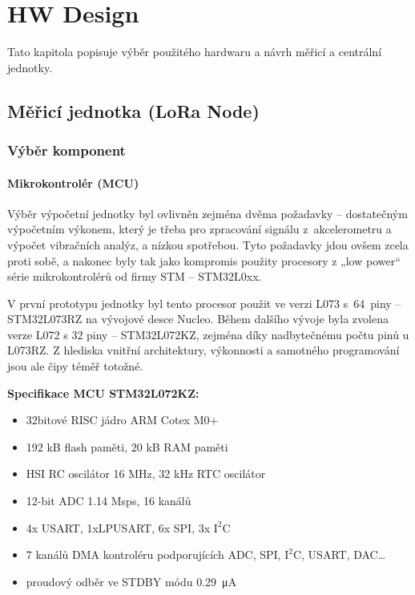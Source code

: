 \chapter{HW Design}
    Tato kapitola popisuje výběr použitého hardwaru a návrh měřicí a centrální jednotky.
\section{Měřicí jednotka (LoRa Node)}
\subsection{Výběr komponent}
\subsubsection{Mikrokontrolér (MCU)}
    Výběr výpočetní jednotky byl ovlivněn zejména dvěma požadavky – dostatečným výpočetním výkonem, který je třeba pro zpracování signálu z~akcelerometru a výpočet vibračních analýz, a nízkou spotřebou. Tyto požadavky jdou ovšem zcela proti sobě, a nakonec byly tak jako kompromis použity procesory z „low power“ série mikrokontrolérů od firmy STM – STM32L0xx.
    
    V první prototypu jednotky byl tento procesor použit ve verzi L073 s~64~piny – STM32L073RZ na vývojové desce Nucleo. Během dalšího vývoje byla zvolena verze L072 s 32 piny – STM32L072KZ, zejména díky nadbytečnému počtu pinů u L073RZ. Z hlediska vnitřní architektury, výkonnosti a samotného programování jsou ale čipy téměř totožné.
    
    \textbf{Specifikace MCU STM32L072KZ:}  \cite{manual:6}
    \begin{itemize}
            \item 32bitové RISC jádro ARM Cotex M0+
            \item 192 kB flash paměti, 20 kB RAM paměti
            \item HSI RC oscilátor 16 MHz, 32 kHz RTC oscilátor
            \item 12-bit ADC 1.14 Msps, 16 kanálů
            \item 4x USART, 1xLPUSART, 6x SPI, 3x $\text{I}^2\text{C}$
            \item 7 kanálů DMA kontroléru podporujících ADC, SPI, $\text{I}^2\text{C}$, USART, DAC\ldots
            \item proudový odběr ve STDBY módu \SI{0.29}{\micro\ampere}
        \end{itemize}
        
